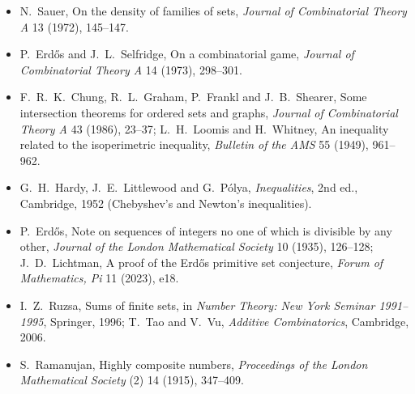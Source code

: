 \begin{itemize}
(1966), 153--155.
\item N.~Sauer, On the density of families of sets, \emph{Journal of Combinatorial Theory A} 13 (1972), 145--147.
\item P.~Erdős and J.~L.~Selfridge, On a combinatorial game, \emph{Journal of Combinatorial Theory A} 14 (1973), 298--301.
\item F.~R.~K.~Chung, R.~L.~Graham, P.~Frankl and J.~B.~Shearer, Some intersection theorems for ordered sets and graphs, \emph{Journal of
Combinatorial Theory A} 43 (1986), 23--37; L.~H.~Loomis and H.~Whitney, An inequality related to the isoperimetric inequality,
\emph{Bulletin of the AMS} 55 (1949), 961--962.
\item G.~H.~Hardy, J.~E.~Littlewood and G.~Pólya, \emph{Inequalities}, 2nd ed., Cambridge, 1952 (Chebyshev's and Newton's inequalities).
\item P.~Erdős, Note on sequences of integers no one of which is divisible by any other, \emph{Journal of the London Mathematical
Society} 10 (1935), 126--128; J.~D.~Lichtman, A proof of the Erdős primitive set conjecture, \emph{Forum of Mathematics, Pi} 11 (2023), e18.
\item I.~Z.~Ruzsa, Sums of finite sets, in \emph{Number Theory: New York Seminar 1991--1995}, Springer, 1996; T.~Tao and V.~Vu,
\emph{Additive Combinatorics}, Cambridge, 2006.
\item S.~Ramanujan, Highly composite numbers, \emph{Proceedings of the London Mathematical Society} (2) 14 (1915), 347--409.
\end{itemize}
